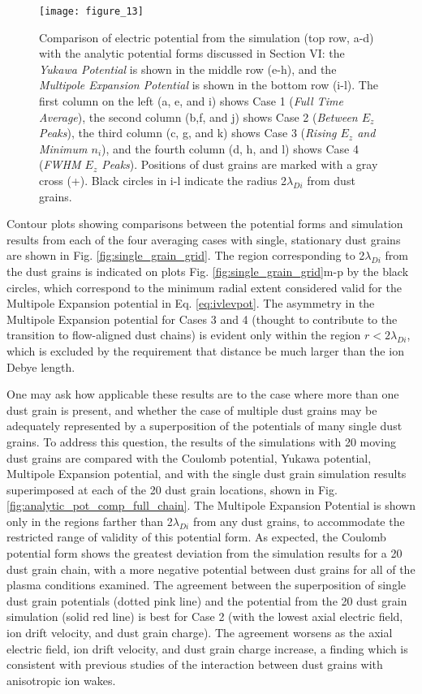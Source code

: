\documentclass[aip,amsmath,amssymb,graphicx,floatfix,reprint]{revtex4-1}
\begin{document}
\begin{figure*}[t]
\texttt{[image: figure\_13]}
\caption{Comparison of electric potential from the simulation (top row, a-d) with the analytic potential forms discussed in Section VI: the \emph{Yukawa Potential} is shown in the middle row (e-h), and the \emph{Multipole Expansion Potential} is shown in the bottom row (i-l).  The first column on the left (a, e, and i) shows Case 1 (\emph{Full Time Average}), the second column (b,f, and j) shows Case 2 (\emph{Between $E_z$ Peaks}), the third column (c, g, and k) shows Case 3 (\emph{Rising $E_z$ and Minimum $n_i$}), and the fourth column (d, h, and l) shows Case 4 (\emph{FWHM $E_z$ Peaks}).  Positions of dust grains are marked with a gray cross (+).  Black circles in i-l indicate the radius 2$\lambda_{Di}$ from dust grains.}
\label{fig:all_pot_comp}
\end{figure*}

Contour plots showing comparisons between the potential forms and simulation results from each of the four averaging cases with single, stationary dust grains are shown in Fig. \ref{fig:single_grain_grid}.  The region corresponding to 2$\lambda_{Di}$ from the dust grains is indicated on plots Fig. \ref{fig:single_grain_grid}m-p by the black circles, which correspond to the minimum radial extent considered valid for the Multipole Expansion potential in Eq. \ref{eq:ivlevpot}.  The asymmetry in the Multipole Expansion potential for Cases 3 and 4 (thought to contribute to the transition to flow-aligned dust chains\cite{Ivlev2011}) is evident only within the region $r< 2\lambda_{Di}$, which is excluded by the requirement that distance be much larger than the ion Debye length.


One may ask how applicable these results are to the case where more than one dust grain is present, and whether the case of multiple dust grains may be adequately represented by a superposition of the potentials of many single dust grains.  To address this question, the results of the simulations with 20 moving dust grains are compared with the Coulomb potential, Yukawa potential, Multipole Expansion potential, and with the single dust grain simulation results superimposed at each of the 20 dust grain locations, shown in Fig. \ref{fig:analytic_pot_comp_full_chain}.  The Multipole Expansion Potential is shown only in the regions farther than 2$\lambda_{Di}$ from any dust grains, to accommodate the restricted range of validity of this potential form.  As expected, the Coulomb potential form shows the greatest deviation from the simulation results for a 20 dust grain chain, with a more negative potential between dust grains for all of the plasma conditions examined.  The agreement between the superposition of single dust grain potentials (dotted pink line) and the potential from the 20 dust grain simulation (solid red line) is best for Case 2 (with the lowest axial electric field, ion drift velocity, and dust grain charge).  The agreement worsens as the axial electric field, ion drift velocity, and dust grain charge increase, a finding which is consistent with previous studies of the interaction between dust grains with anisotropic ion wakes\cite{Ivlev2008,Yaroshenko2021}.
\end{document}

